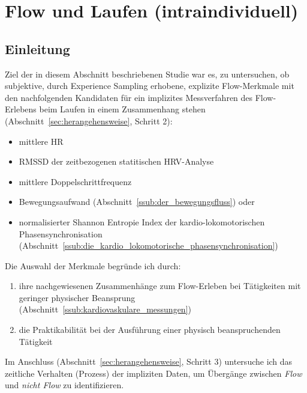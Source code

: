 

\section{Flow und Laufen (intraindividuell)} 

\label{sec:flow_und_laufen_intraindividuell}

\subsection{Einleitung} 

\label{sub:einleitung_5_1}

Ziel der in diesem Abschnitt beschriebenen Studie war es, zu untersuchen, ob subjektive, durch Experience Sampling erhobene, explizite Flow-Merkmale mit den nachfolgenden Kandidaten für ein implizites Messverfahren des Flow-Erlebens beim Laufen in einem Zusammenhang stehen (Abschnitt~\ref{sec:herangehensweise}, Schritt 2): 
\begin{itemize}
	\item mittlere \ac{HR} 
	\item \acs{RMSSD} der zeitbezogenen statitischen \ac{HRV}-Analyse 
	\item mittlere Doppelschrittfrequenz 
	\item Bewegungsaufwand (Abschnitt~\ref{ssub:der_bewegungsfluss}) oder 
	\item normalisierter Shannon Entropie Index der kardio-lokomotorischen Phasensynchronisation (Abschnitt~\ref{ssub:die_kardio_lokomotorische_phasensynchronisation}) 
\end{itemize}

Die Auswahl der Merkmale begründe ich durch: 
\begin{enumerate}
	\item ihre nachgewiesenen Zusammenhänge zum Flow-Erleben bei Tätigkeiten mit geringer physischer Beansprung (Abschnitt~\ref{ssub:kardiovaskulare_messungen}) 
	\item die Praktikabilität bei der Ausführung einer physisch beanspruchenden Tätigkeit 
\end{enumerate}

Im Anschluss (Abschnitt~\ref{sec:herangehensweise}, Schritt 3) untersuche ich das zeitliche Verhalten (Prozess) der impliziten Daten, um Übergänge zwischen \emph{Flow} und \emph{nicht Flow} zu identifizieren.

